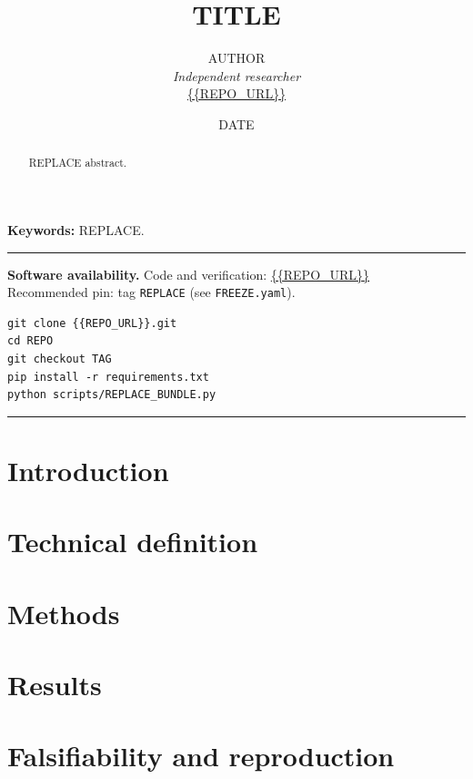 \documentclass[11pt,a4paper]{article}
\title{{{TITLE}}}
\author{{{AUTHOR}}\\
\textit{Independent researcher}\\[0.5em]
\url{{{REPO_URL}}}}
\date{{{DATE}}}
\begin{document}
\maketitle

\begin{abstract}
REPLACE abstract.
\end{abstract}

\noindent\textbf{Keywords:} REPLACE.

\vspace{0.6em}
\noindent
\begin{center}
\begin{minipage}{0.95\linewidth}
\hrule\vspace{0.4em}
{\small
\textbf{Software availability.}
Code and verification: \url{{{REPO_URL}}}\\
Recommended pin: tag \texttt{REPLACE} (see \texttt{FREEZE.yaml}).
\begin{verbatim}
git clone {{REPO_URL}}.git
cd REPO
git checkout TAG
pip install -r requirements.txt
python scripts/REPLACE_BUNDLE.py
\end{verbatim}
}
\vspace{0.4em}\hrule
\end{minipage}
\end{center}

\section{Introduction}
\label{sec:intro}

\section{Technical definition}
\label{sec:def}

\section{Methods}
\label{sec:methods}

\section{Results}
\label{sec:results}

\section{Falsifiability and reproduction}
\label{sec:repro}
\end{document}
